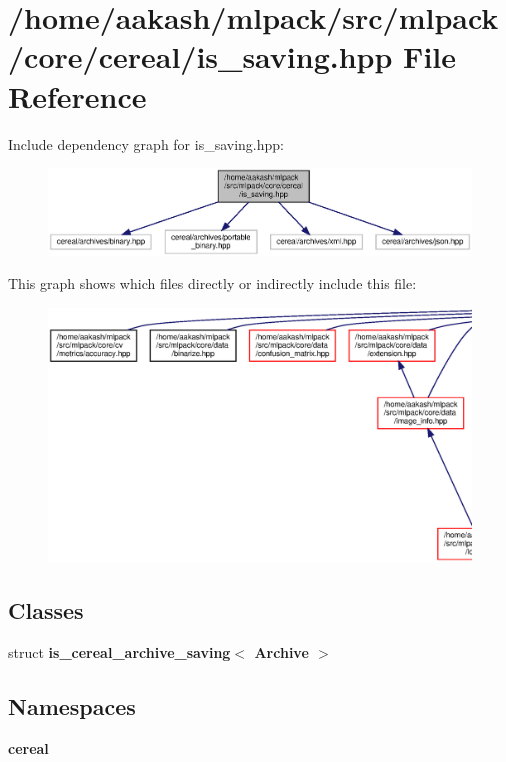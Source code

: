 \section{/home/aakash/mlpack/src/mlpack/core/cereal/is\+\_\+saving.hpp File Reference}
\label{is__saving_8hpp}
Include dependency graph for is\+\_\+saving.\+hpp\+:
\nopagebreak
\begin{figure}[H]
\begin{center}
\leavevmode
\includegraphics[width=350pt]{is__saving_8hpp__incl}
\end{center}
\end{figure}
This graph shows which files directly or indirectly include this file\+:
\nopagebreak
\begin{figure}[H]
\begin{center}
\leavevmode
\includegraphics[width=350pt]{is__saving_8hpp__dep__incl}
\end{center}
\end{figure}
\subsection*{Classes}
\begin{DoxyCompactItemize}
\item 
struct \textbf{ is\+\_\+cereal\+\_\+archive\+\_\+saving$<$ Archive $>$}
\end{DoxyCompactItemize}
\subsection*{Namespaces}
\begin{DoxyCompactItemize}
\item 
 \textbf{ cereal}
\end{DoxyCompactItemize}
